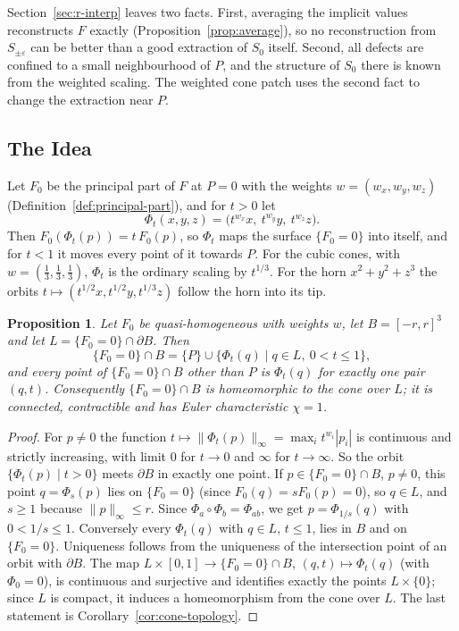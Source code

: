 \documentclass[12pt, a4paper, oneside]{book}
\theoremstyle{plain}
\newtheorem{proposition}[theorem]{Proposition}
\theoremstyle{definition}
\theoremstyle{remark}
\theoremstyle{definition}
\begin{document}
Section~\ref{sec:r-interp} leaves two facts. First, averaging the implicit values reconstructs $F$ exactly (Proposition~\ref{prop:average}), so no reconstruction from $S_{\pm\varepsilon}$ can be better than a good extraction of $S_0$ itself. Second, all defects are confined to a small neighbourhood of $P$, and the structure of $S_0$ there is known from the weighted scaling. The weighted cone patch uses the second fact to change the extraction near $P$.

\subsection{The Idea}
\label{sec:r-cone-idea}

Let $F_0$ be the principal part of $F$ at $P=0$ with the weights $w=(w_x,w_y,w_z)$ (Definition~\ref{def:principal-part}), and for $t>0$ let
\[
\Phi_t(x,y,z)=\big(t^{w_x}x,\ t^{w_y}y,\ t^{w_z}z\big).
\]
Then $F_0(\Phi_t(p))=t\,F_0(p)$, so $\Phi_t$ maps the surface $\{F_0=0\}$ into itself, and for $t<1$ it moves every point of it towards $P$. For the cubic cones, with $w=(\tfrac13,\tfrac13,\tfrac13)$, $\Phi_t$ is the ordinary scaling by $t^{1/3}$. For the horn $x^2+y^2+z^3$ the orbits $t\mapsto(t^{1/2}x,t^{1/2}y,t^{1/3}z)$ follow the horn into its tip.

\begin{proposition}
\label{prop:cone-structure}
Let $F_0$ be quasi-homogeneous with weights $w$, let $B=[-r,r]^3$ and let $L=\{F_0=0\}\cap\partial B$. Then
\[
\{F_0=0\}\cap B=\{P\}\cup\{\Phi_t(q) \mid q\in L,\ 0<t\le1\},
\]
and every point of $\{F_0=0\}\cap B$ other than $P$ is $\Phi_t(q)$ for exactly one pair $(q,t)$. Consequently $\{F_0=0\}\cap B$ is homeomorphic to the cone over $L$; it is connected, contractible and has Euler characteristic $\chi=1$.
\end{proposition}

\begin{proof}
For $p\neq0$ the function $t\mapsto\|\Phi_t(p)\|_\infty=\max_i t^{w_i}|p_i|$ is continuous and strictly increasing, with limit $0$ for $t\to0$ and $\infty$ for $t\to\infty$. So the orbit $\{\Phi_t(p) \mid t>0\}$ meets $\partial B$ in exactly one point. If $p\in\{F_0=0\}\cap B$, $p\neq0$, this point $q=\Phi_s(p)$ lies on $\{F_0=0\}$ (since $F_0(q)=sF_0(p)=0$), so $q\in L$, and $s\ge1$ because $\|p\|_\infty\le r$. Since $\Phi_a\circ\Phi_b=\Phi_{ab}$, we get $p=\Phi_{1/s}(q)$ with $0<1/s\le1$. Conversely every $\Phi_t(q)$ with $q\in L$, $t\le1$, lies in $B$ and on $\{F_0=0\}$. Uniqueness follows from the uniqueness of the intersection point of an orbit with $\partial B$. The map $L\times[0,1]\to\{F_0=0\}\cap B$, $(q,t)\mapsto\Phi_t(q)$ (with $\Phi_0=0$), is continuous and surjective and identifies exactly the points $L\times\{0\}$; since $L$ is compact, it induces a homeomorphism from the cone over $L$. The last statement is Corollary~\ref{cor:cone-topology}.
\end{proof}
\end{document}
